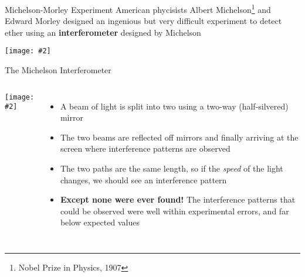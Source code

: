 \documentclass[12pt,compress,aspectratio=169]{beamer}
\newcommand{\pic}[2]{\texttt{[image: \#2]}}
\begin{document}
\begin{frame}{Michelson-Morley Experiment}
  American phycisists Albert Michelson\footnote{Nobel Prize in Physics, 1907}
  and Edward Morley designed an ingenious but very difficult experiment to
  detect ether using an \textbf{interferometer} designed by Michelson
  \begin{center}
    \pic{.75}{graphics/michelsonmorley.jpg}
  \end{center}
\end{frame}



\begin{frame}{The Michelson Interferometer}
  \begin{columns}
    \begin{center}
      \pic{1.15}{graphics/313754.jpg}
    \end{center}

    \begin{itemize}
    \item A beam of light is split into two using a two-way (half-silvered)
      mirror
    \item The two beams are reflected off mirrors and finally arriving at the
      screen where interference patterns are observed
    \item The two paths are the same length, so if the \emph{speed} of the light
      changes, we should see an interference pattern
    \item\textbf{Except none were ever found!} The interference patterns that
      could be observed were well within experimental errors, and far below
      expected values
    \end{itemize}
  \end{columns}
\end{frame}
\end{document}

